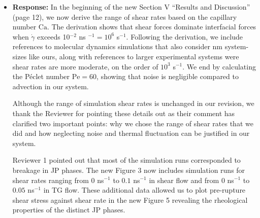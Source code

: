 \documentclass[11pt]{article}
\begin{document}
\begin{itemize}
\item {\bf Response:}
  In the beginning  of the new Section V ``Results and Discussion'' (page 12),
  we now derive the range of shear rates 
  based on the capillary number $\mathrm{Ca}$.  The derivation shows that shear forces dominate
  interfacial forces when $\dot \gamma$ exceeds
  10$^{-2}$ ns $^{-1} = 10^6$ s$^{-1}$.  Following the derivation,
  we include references to molecular dynamics simulations that also
  consider nm system-sizes like ours, along with references to
  larger experimental systems were shear rates are more moderate,
  on the order of $10^3$ s$^{-1}$.  We end by calculating the
  P\'eclet number $\mathrm{Pe} = 60$, showing that
  noise is negligible compared to advection in our system.  

  Although the range of simulation shear rates is unchanged in our
  revision, we thank the Reviewer for pointing these details out
  as their comment has clarified
  two important points: why we chose the range of shear
  rates that we did and how neglecting noise and
  thermal fluctuation can be justified in our system.

  Reviewer 1 pointed out that most of the simulation runs
  corresponded to breakage in JP phases. The new Figure 3
  now includes simulation runs for shear rates ranging
  from $0$ ns$^{-1}$ to $0.1$ ns$^{-1}$ in shear flow
  and from $0$ ns$^{-1}$ to $0.05$ ns$^{-1}$ in TG flow.
  These additional data allowed us to plot pre-rupture
  shear stress against shear rate in the new Figure 5
  revealing the rheological properties of the distinct
  JP phases. 
\end{itemize}
\end{document}
